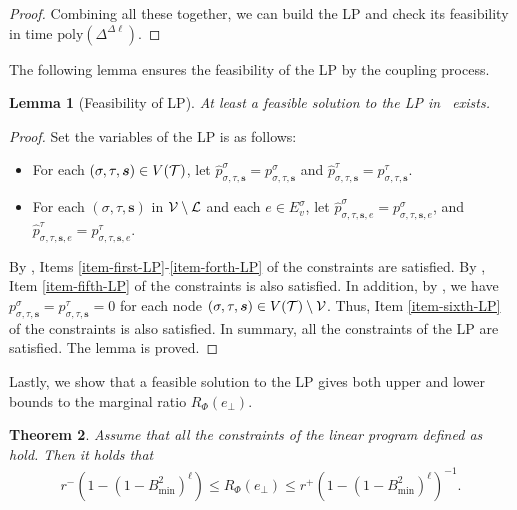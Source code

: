 \documentclass[11pt]{article}
\newtheorem{theorem}{Theorem}
\newtheorem{lemma}[theorem]{Lemma}
\newtheorem*{remark}{Remark}
\def\poly{\mathrm{poly}}
\newcommand{\seqS}{\boldsymbol{s}}
\newcommand{\hktodo}[1]{{\color{blue}{#1}}}
\begin{document}
\begin{proof}
    Combining all these together, we can build the LP and check its feasibility in time $\poly\left(\Delta^{\Delta\ell}\right)$.
\end{proof}

The following lemma ensures the feasibility of the LP by the coupling process.

\begin{lemma}[Feasibility of LP] \label{lem:feasibility-of-LP}
    At least a feasible solution to the LP in~ exists.
\end{lemma}
\begin{proof}
Set the variables of the LP is as follows:
\begin{itemize}
    \item For each $(\sigma, \tau, \seqS) \in V(\+T)$, let $\widehat{p}_{\sigma, \tau, \seqS}^{\sigma} = p_{\sigma, \tau, \seqS}^{\sigma}$ and $\widehat{p}_{\sigma,\tau, \seqS}^{\tau} = p_{\sigma,\tau, \seqS}^{\tau}$.
    \item For each $(\sigma,\tau,\seqS)$ in $\mathcal{V}\setminus \mathcal{L}$ and each $e\in E_v^{\sigma}$, let  $\widehat{p}_{\sigma,\tau,\seqS,e}^{\sigma} = p_{\sigma,\tau,\seqS,e}^{\sigma}$, and $\widehat{p}_{\sigma,\tau,\seqS,e}^{\tau} = p_{\sigma,\tau,\seqS,e}^{\tau}$.
\end{itemize}
By , Items \ref{item-first-LP}-\ref{item-forth-LP} of the constraints are satisfied.
By , Item \ref{item-fifth-LP} of the constraints is also satisfied.
In addition, by , we have $ p^{\sigma}_{\sigma, \tau, \seqS}= p^{\tau}_{\sigma, \tau, \seqS} = 0$ for each node $(\sigma, \tau, \seqS)\in V(\+T)\setminus \+V$.
Thus, Item \ref{item-sixth-LP} of the constraints is also satisfied.
In summary, all the constraints of the LP are satisfied.
The lemma is proved.
\end{proof}

Lastly, we show that a feasible solution to the LP gives both upper and lower bounds to the marginal ratio $R_{\Phi}(e_\bot)$.

\hktodo{polish the following theorem}

\begin{theorem} \label{thm:ratio-bound-by-LP}
    Assume that all the constraints of the linear program defined as~ hold. Then it holds that
    \begin{align*}
        r^{-} \left(1 - \left(1 - B_{\min}^2\right)^{\ell}\right)\le R_{\Phi}(e_\bot) \le {r^+}\left(1 - \left(1 - B_{\min}^2\right)^{\ell}\right)^{-1}.
    \end{align*}
\end{theorem}
\end{document}
